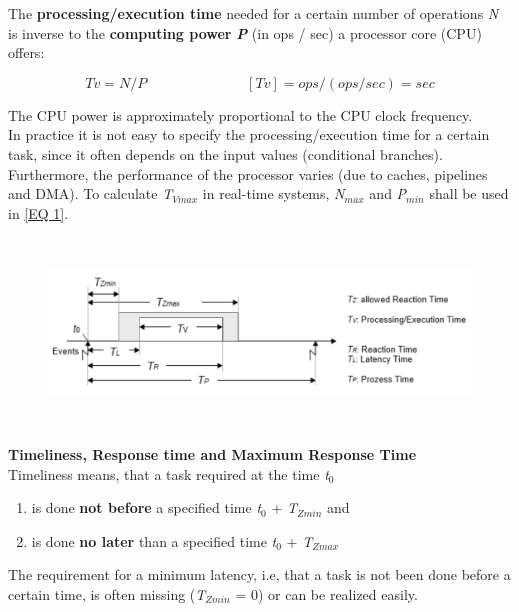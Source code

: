 The \textbf{processing/execution time }needed for a certain number of operations \textit{N} is inverse to the \textbf{computing power} \textbf{\textit{P}} (in ops / sec) a processor core (CPU) offers:

\begin{equation}
	Tv = N / P \hspace{3cm} [Tv] = ops / (ops / sec) = sec
\label{EQ 1}
\end{equation}

The CPU power is approximately proportional to the CPU clock frequency.\\

In practice it is not easy to specify the processing/execution time for a certain task, since it often depends on the input values (conditional branches). Furthermore, the performance of the processor varies (due to caches, pipelines and DMA). To calculate \textit{T${}_{Vmax}$} in real-time systems, \textit{N${}_{max}$} and \textit{P${}_{min}$} shall be used in \ref{EQ 1}.

	\begin{figure}[h]
    \centering
    \includegraphics[width=15cm, height=5cm]{Images/image75.png}
    \label{fig:Fig 21}
    \end{figure}

\textbf{Timeliness, Response time and Maximum Response Time}\\

Timeliness means, that a task required at the time \textit{t}${}_{0}$
\begin{enumerate}
\item is done \textbf{not before} a specified time \textit{t}${}_{0}$ + \textit{T${}_{Zmin}$} and
\item is done \textbf{no later} than a specified time \textit{t}${}_{0}$ + \textit{T${}_{Zmax}$}
\end{enumerate}

The requirement for a minimum latency, i.e, that a task is not been done before a certain time, is often missing (\textit{T${}_{Zmin}$} = 0) or can be realized easily.\\ 

